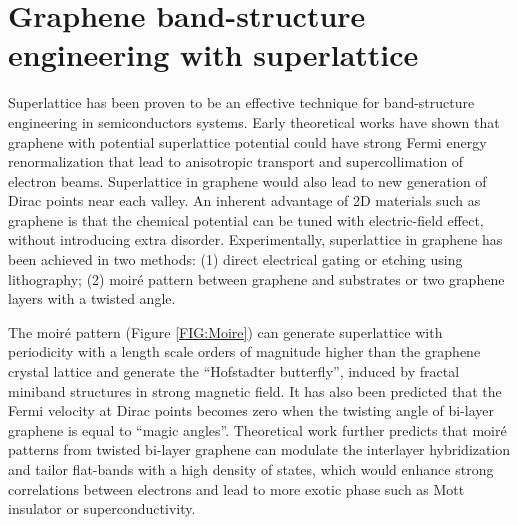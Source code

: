 \documentclass[pdflatex, sectionletters, 12pt]{pittetd}    %
\begin{document}
\section{Graphene band-structure engineering with superlattice}

Superlattice has been proven to be an effective technique for band-structure engineering in semiconductors systems\cite{tsu2010superlattice}. Early theoretical works have shown that graphene with potential superlattice potential could have strong Fermi energy renormalization that lead to anisotropic transport\cite{park2008anisotropic} and supercollimation of electron beams\cite{park2008electron}. Superlattice in graphene would also lead to new generation of Dirac points near each valley\cite{park2008new}. An inherent advantage of 2D materials such as graphene is that the chemical potential can be tuned with electric-field effect, without introducing extra disorder\cite{cao2018correlated}. Experimentally, superlattice in graphene has been achieved in two methods: (1) direct electrical gating or etching using lithography\cite{dubey2013tunable, forsythe2018band, jessen2019lithographic}; (2) moir{\'e} pattern between graphene and substrates\cite{dean2013hofstadter, hunt2013massive, ponomarenko2013cloing} or two graphene layers with a twisted angle\cite{cao2016superlattice, cao2018correlated, cao2018unconventional, chen2018gate, yankowitz2018dynamic}. 

The moir{\'e} pattern (Figure \ref{FIG:Moire}) can generate superlattice with periodicity with a length scale orders of magnitude higher than the graphene crystal lattice and generate the ``Hofstadter butterfly'', induced by fractal miniband structures in strong magnetic field\cite{dean2013hofstadter, hunt2013massive, ponomarenko2013cloing}. It has also been predicted\cite{bistritzer2011moire} that the Fermi velocity at Dirac points becomes zero when the twisting angle of bi-layer graphene is equal to ``magic angles''. Theoretical work\cite{bistritzer2011moire, suarez2010flat, lopes2012continuum} further predicts that moir{\'e} patterns from twisted bi-layer graphene can modulate the interlayer hybridization and tailor flat-bands with a high density of states, which would enhance strong correlations between electrons and lead to more exotic phase such as Mott insulator\cite{cao2016superlattice, cao2018correlated, chen2018gate} or superconductivity\cite{cao2018unconventional}.
\end{document}
